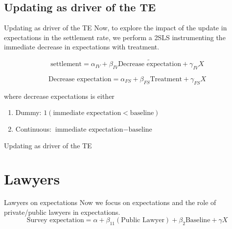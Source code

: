 \documentclass[8pt]{beamer}
\begin{document}
\subsection{Updating as driver of the TE}
\begin{frame}{Updating as driver of the TE}
Now, to explore the impact of the update in expectations in the settlement rate, we perform a 2SLS instrumenting the immediate decrease in expectations with treatment.

\[\text{settlement}=\alpha_{IV}+\beta_{IV}\widetilde{\text{Decrease expectation}}+\gamma_{IV}X\]

\[\text{Decrease expectation}=\alpha_{FS}+\beta_{FS}\text{Treatment}+\gamma_{FS}X\]

where decrease expectations is either
\begin{enumerate}
    \item Dummy: $1(\text{immediate expectation}<\text{baseline})$
    \item Continuous: $\text{immediate expectation}-\text{baseline}$
\end{enumerate}
\end{frame}

\begin{frame}{Updating as driver of the TE}

\begin{table}[H]
\caption{Immediate updating in 2M settlement}
\begin{center}
\tiny{}
\end{center}
\end{table}     
\end{frame}

\section{Lawyers}

\begin{frame}{Lawyers on expectations}
    Now we focus on expectations and the role of private/public lawyers in expectations. 
\[\text{Survey expectation}= \alpha+\beta_11(\text{Public Lawyer}) + \beta_2 \text{Baseline} + \gamma X\]
\begin{table}[H]
      \centering
        \tiny{}
\end{table}

\end{frame}
\end{document}
